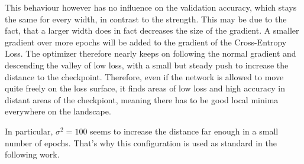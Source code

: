This behaviour however has no influence on the validation accuracy, which stays
the same for every width, in contrast to the strength. This may be due to the
fact, that a larger width does in fact decreases the size of the gradient. A
smaller gradient over more epochs will be added to the gradient of the
Cross-Entropy Loss. The optimizer therefore nearly keeps on following the normal
gradient and descending the valley of low loss, with a small but steady push to
increase the distance to the checkpoint. Therefore, even if the network is
allowed to move quite freely on the loss surface, it finds areas of low loss and
high accuracy in distant areas of the checkpiont, meaning there has to be good
local minima everywhere on the landscape.

In particular, $\sigma^2 = 100$ seems to increase the distance far enough in a
small number of epochs. That's why this configuration is used as standard in the
following work.

